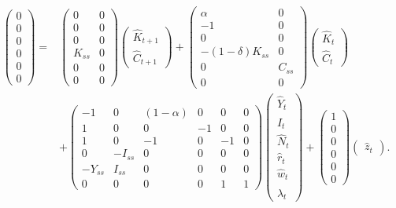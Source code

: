 \documentclass[11pt]{article}
\numberwithin{equation}{section} %
\numberwithin{figure}{section} %
\numberwithin{table}{section} %
\theoremstyle{definition}
\begin{document}
\begin{align*}
    \begin{pmatrix}
        0 \\ 0 \\ 0 \\ 0 \\ 0 \\ 0
    \end{pmatrix} = &\begin{pmatrix}
        0 & 0 \\
        0 & 0 \\
        0 & 0 \\
        K_{ss} & 0 \\
        0 & 0 \\
        0 & 0
    \end{pmatrix} \begin{pmatrix}
        \hat{K}_{t+1} \\
        \hat{C}_{t+1}
    \end{pmatrix} + \begin{pmatrix}
        \alpha & 0 \\
        -1 & 0 \\
        0 & 0 \\
        -(1-\delta) K_{ss} & 0 \\
        0 & C_{ss} \\
        0 & 0
    \end{pmatrix} \begin{pmatrix}
        \hat{K}_t \\
        \hat{C}_t
    \end{pmatrix} \\
    &+ \begin{pmatrix}
        -1 & 0 & (1-\alpha) & 0 & 0 & 0 \\
        1 & 0 & 0 & -1 & 0 & 0 \\
        1 & 0 & -1 & 0 & -1 & 0 \\
        0 & -I_{ss} & 0 & 0 & 0 & 0 \\
        -Y_{ss} & I_{ss} & 0 & 0 & 0 & 0 \\
        0 & 0 & 0 & 0 & 1 & 1
    \end{pmatrix} \begin{pmatrix}
        \hat{Y}_t \\
        \hat{I}_t \\
        \hat{N}_t \\
        \hat{r}_t \\
        \hat{w}_t \\
        \hat{\lambda}_t
    \end{pmatrix} + \begin{pmatrix}
         1 \\ 0 \\ 0 \\ 0 \\ 0 \\ 0
    \end{pmatrix} \begin{pmatrix}
        \hat{z}_t
    \end{pmatrix}.
\end{align*}
\end{document}
